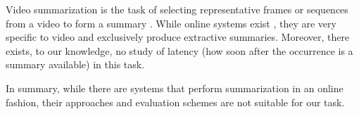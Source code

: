 Video summarization is the task of selecting representative frames or sequences from a video to form a summary \citep{apostolidis2021video}. While online systems exist \citep{lal2019online,zhao2014quasi}, they are very specific to video and exclusively produce extractive summaries. Moreover, there exists, to our knowledge, no study of latency (how soon after the occurrence is a summary available) in this task.


In summary, while there are systems that perform summarization in an online fashion, their approaches and evaluation schemes are not suitable for our task.


